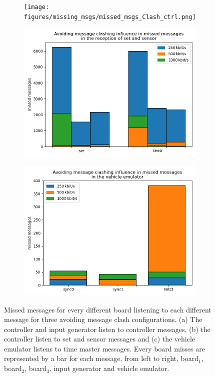 \documentclass[table,xcdraw]{article}
\begin{document}
\begin{figure}[h!]
     \centering
     \begin{subfigure}[b]{0.8\textwidth}
         \centering
         \texttt{[image: figures/missing\_msgs/missed\_msgs\_Clash\_ctrl.png]}
         \caption{}
     \end{subfigure}
     \hfill
     \begin{subfigure}[b]{0.4\textwidth}
         \centering
         \includegraphics[width=\textwidth]{figures/missing_msgs/missed_msgs_Clash_set_sensr.png}
         \caption{}
     \end{subfigure}
     \hfill
     \begin{subfigure}[b]{0.4\textwidth}
         \centering
         \includegraphics[width=\textwidth]{figures/missing_msgs/missed_msgs_Clash_vem.png}
         \caption{}
     \end{subfigure}
        \caption{Missed messages for every different board listening to each different message for three avoiding message clash configurations. (a) The controller and input generator listen to controller messages, (b) the controller listen to set and sensor messages and (c) the vehicle emulator listens to time master messages. Every board misses are represented by a bar for each message, from left to right, board$_1$, board$_2$, board$_3$, input generator and vehicle emulator.}
        \label{fig:mss_msgs_clash}
\end{figure}
\end{document}
